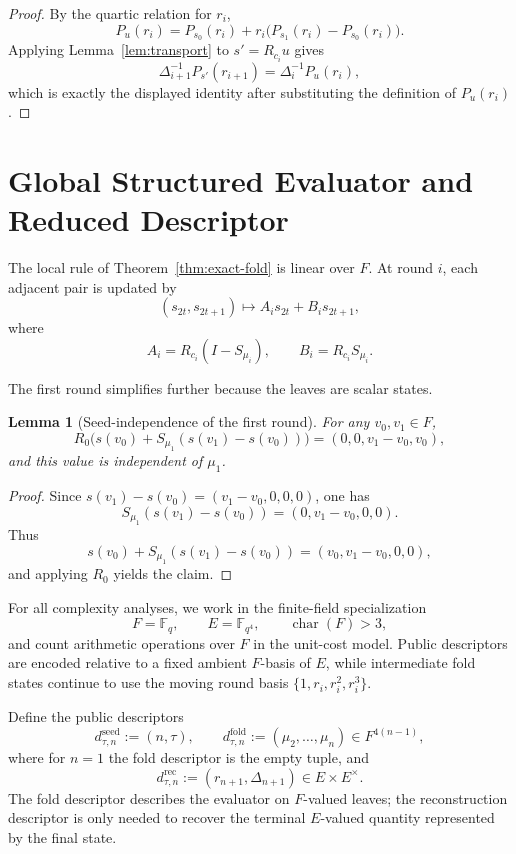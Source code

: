 \documentclass[11pt]{article}
\newtheorem{lemma}[theorem]{Lemma}
\begin{document}
\begin{proof}
By the quartic relation for \(r_i\),
\[
P_u(r_i)=P_{s_0}(r_i)+r_i\big(P_{s_1}(r_i)-P_{s_0}(r_i)\big).
\]
Applying Lemma~\ref{lem:transport} to \(s'=R_{c_i}u\) gives
\[
\Delta_{i+1}^{-1}P_{s'}(r_{i+1})=\Delta_i^{-1}P_u(r_i),
\]
which is exactly the displayed identity after substituting the definition of \(P_u(r_i)\).
\end{proof}

\section{Global Structured Evaluator and Reduced Descriptor}

The local rule of Theorem~\ref{thm:exact-fold} is linear over \(F\). At round \(i\), each adjacent pair is updated by
\[
(s_{2t},s_{2t+1})\longmapsto A_i s_{2t}+B_i s_{2t+1},
\]
where
\[
A_i=R_{c_i}(I-S_{\mu_i}),
\qquad
B_i=R_{c_i}S_{\mu_i}.
\]

The first round simplifies further because the leaves are scalar states.

\begin{lemma}[Seed-independence of the first round]
\label{lem:first-round}
For any \(v_0,v_1\in F\),
\[
R_0\big(s(v_0)+S_{\mu_1}(s(v_1)-s(v_0))\big)=(0,0,v_1-v_0,v_0),
\]
and this value is independent of \(\mu_1\).
\end{lemma}

\begin{proof}
Since \(s(v_1)-s(v_0)=(v_1-v_0,0,0,0)\), one has
\[
S_{\mu_1}(s(v_1)-s(v_0))=(0,v_1-v_0,0,0).
\]
Thus
\[
s(v_0)+S_{\mu_1}(s(v_1)-s(v_0))=(v_0,v_1-v_0,0,0),
\]
and applying \(R_0\) yields the claim.
\end{proof}

For all complexity analyses, we work in the finite-field specialization
\[
F=\mathbb F_q,
\qquad
E=\mathbb F_{q^4},
\qquad
\operatorname{char}(F)>3,
\]
and count arithmetic operations over \(F\) in the unit-cost model. Public descriptors are encoded relative to a fixed ambient \(F\)-basis of \(E\), while intermediate fold states continue to use the moving round basis \(\{1,r_i,r_i^2,r_i^3\}\).

Define the public descriptors
\[
d^{\mathrm{seed}}_{\tau,n}:=(n,\tau),
\qquad
d^{\mathrm{fold}}_{\tau,n}:=(\mu_2,\dots,\mu_n)\in F^{4(n-1)},
\]
where for \(n=1\) the fold descriptor is the empty tuple, and
\[
d^{\mathrm{rec}}_{\tau,n}:=(r_{n+1},\Delta_{n+1})\in E\times E^\times.
\]
The fold descriptor describes the evaluator on \(F\)-valued leaves; the reconstruction descriptor is only needed to recover the terminal \(E\)-valued quantity represented by the final state.
\end{document}
